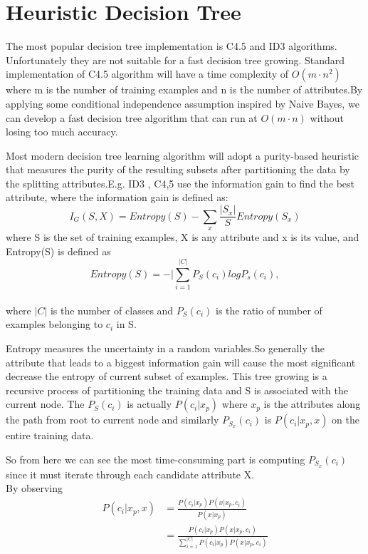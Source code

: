 \documentclass[11pt,twocolumn]{article}
\begin{document}
\section{Heuristic Decision Tree}
\par{The most popular decision tree implementation is C4.5 and ID3 algorithms. Unfortunately they are not suitable for a fast decision tree growing. Standard implementation of C4.5 algorithm
will have a time complexity of $O(m \cdot n^2)$ where m is the number of training examples and n is the number of attributes.By applying some conditional independence assumption inspired by Naive
Bayes, we can develop a fast decision tree algorithm \cite{Fast_Tree} that can run at $O(m \cdot n)$ without losing too much accuracy.}
\par{
Most modern decision tree learning algorithm will adopt a purity-based heuristic that measures the purity of the resulting subsets after partitioning the data by the splitting attributes.E.g.
ID3 , C4,5 use the information gain to find the best attribute, where the information gain is defined as:
\[I_G(S,X) = Entropy(S) - \sum_x{\frac{|S_x|}{S}Entropy(S_x)}\]
where S is the set of training examples, X is any attribute and x is its value, and Entropy(S) is defined as\\
\[Entropy(S) = - |\sum_{i=1}^{|C|}P_S(c_i)logP_s(c_i),\]\\
where $|C|$ is the number of classes and $P_S(c_i)$ is the ratio of number of examples belonging to $c_i$ in S.}
\par{
Entropy measures the uncertainty in a random variables.So generally the attribute that leads to a biggest information gain will cause the most
significant decrease the entropy of current subset of examples. This tree growing is a recursive process of partitioning the training data and S is associated
with the current node. The $P_S(c_i)$ is actually $P(c_i|x_p)$ where $x_p$ is the attributes along the path from root to current node and similarly $P_{S_x}(c_i)$
is $P(c_i|x_p,x)$ on the entire training data.}
\par{
So from here we can see the most time-consuming part is computing $P_{S_x}(c_i)$ since it must iterate through each candidate attribute X.\\
By observing \\
\begin{align}
 P(c_i|x_p,x) &= \frac{P(c_i|x_p)P(x|x_p,c_i)}{P(x|x_p)} \\&= \frac {P(c_i|x_p)P(x|x_p,c_i)}{\sum_{i=1}^{|C|}P(c_i|x_p)P(x|x_p,c_i)}
\end{align}
}
\end{document}
